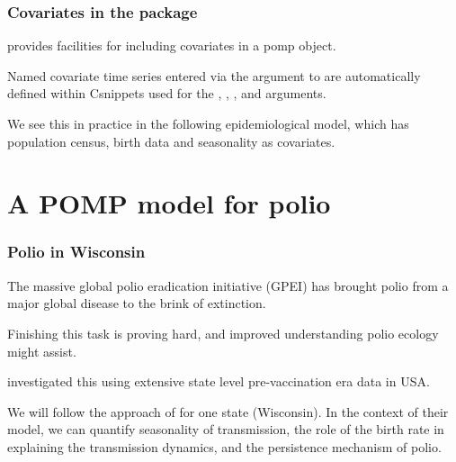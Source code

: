 \begin{frame}[fragile]


\frametitle{Covariates in the  package}

\bi

\item {} provides facilities for including covariates in a pomp object.

\item Named covariate time series entered via the  argument to  are automatically defined within Csnippets used for the , , ,  and  arguments.

\item We see this in practice in the following epidemiological model, which has  population census, birth data and seasonality as covariates.

\ei

\end{frame}

\section{A POMP model for polio}

\begin{frame}[fragile]

\frametitle{Polio in Wisconsin}

\bi

\item The massive global polio eradication initiative (GPEI) has brought polio from a major global disease to the brink of extinction. 

\item Finishing this task is proving hard, and improved understanding polio ecology might assist.  

\item \citet{Martinez-Bakker2015} investigated this using extensive state level pre-vaccination era data in USA. 

\item We will follow the approach of \citet{Martinez-Bakker2015} for one state (Wisconsin). In the context of their model, we can quantify seasonality of transmission, the role of the birth rate in explaining the transmission dynamics, and the persistence mechanism of polio. 


\ei

\end{frame}


